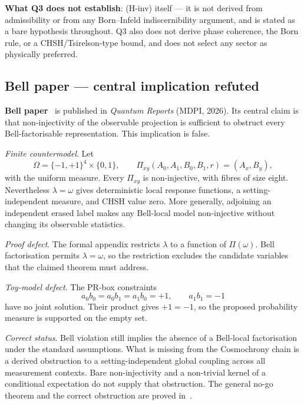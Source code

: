 \documentclass[11pt,a4paper]{article}
\theoremstyle{definition}
\begin{document}
      \textbf{What Q3 does not establish}: (H-inv) itself --- it is not derived from
      admissibility or from any Born--Infeld indiscernibility argument, and is stated as a bare
      hypothesis throughout. Q3 also does not derive phase coherence, the Born rule, or a
      CHSH/Tsirelson-type bound, and does not select any sector as physically preferred.

    \subsection{Bell paper --- central implication refuted}
      \label{sec:bell}

      \textbf{Bell paper}~\cite{Beau2026b} is published in \textit{Quantum Reports}
      (MDPI, 2026). Its central claim is that non-injectivity of the observable projection is
      sufficient to obstruct every Bell-factorisable representation. This implication is false.

      \textit{Finite countermodel}. Let
      \[
        \Omega=\{-1,+1\}^{4}\times\{0,1\},
        \qquad
        \Pi_{xy}(A_0,A_1,B_0,B_1,r)=(A_x,B_y),
      \]
      with the uniform measure. Every $\Pi_{xy}$ is non-injective, with fibres of size eight.
      Nevertheless $\lambda=\omega$ gives deterministic local response functions,
      a setting-independent measure, and CHSH value zero. More generally, adjoining an
      independent erased label makes any Bell-local model non-injective without changing its
      observable statistics.

      \textit{Proof defect}. The formal appendix restricts $\lambda$ to a function of
      $\Pi(\omega)$. Bell factorisation permits $\lambda=\omega$, so the restriction excludes the
      candidate variables that the claimed theorem must address.

      \textit{Toy-model defect}. The PR-box constraints
      \[
        a_0b_0=a_0b_1=a_1b_0=+1,
        \qquad
        a_1b_1=-1
      \]
      have no joint solution. Their product gives $+1=-1$, so the proposed probability measure
      is supported on the empty set.

      \textit{Correct status}. Bell violation still implies the absence of a Bell-local
      factorisation under the standard assumptions. What is missing from the Cosmochrony chain
      is a derived obstruction to a setting-independent global coupling across all measurement
      contexts. Bare non-injectivity and a non-trivial kernel of a conditional expectation do
      not supply that obstruction. The general no-go theorem and the correct obstruction are
      proved in~\cite{Beau2026BellNoGo}.
\end{document}
